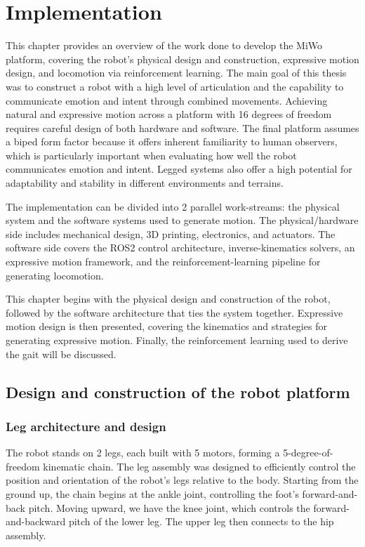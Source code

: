 \setlength{\fboxrule}{0pt}

\chapter{Implementation}
This chapter provides an overview of the work done to develop the MiWo platform, covering the robot's physical design and construction, expressive motion design, and locomotion via reinforcement learning.
The main goal of this thesis was to construct a robot with a high level of articulation and the capability to communicate emotion and intent through combined movements. Achieving natural and expressive motion across a platform with 16 degrees of freedom requires careful design of both hardware and software. The final platform assumes a biped form factor because it offers inherent familiarity to human observers, which is particularly important when evaluating how well the robot communicates emotion and intent. Legged systems also offer a high potential for adaptability and stability in different environments and terrains.

The implementation can be divided into 2 parallel work-streams: the physical system and the software systems used to generate motion. The physical/hardware side includes mechanical design, 3D printing, electronics, and actuators. The software side covers the ROS2 control architecture, inverse-kinematics solvers, an expressive motion framework, and the reinforcement-learning pipeline for generating locomotion. 

This chapter begins with the physical design and construction of the robot, followed by the software architecture that ties the system together. Expressive motion design is then presented, covering the kinematics and strategies for generating expressive motion. Finally, the reinforcement learning used to derive the gait will be discussed.

\section{Design and construction of the robot platform}
\subsection{Leg architecture and design}
The robot stands on 2 legs, each built with 5 motors, forming a 5-degree-of-freedom kinematic chain. The leg assembly was designed to efficiently control the position and orientation of the robot's legs relative to the body. Starting from the ground up, the chain begins at the ankle joint, controlling the foot's forward-and-back pitch. Moving upward, we have the knee joint, which controls the forward-and-backward pitch of the lower leg. The upper leg then connects to the hip assembly. 

